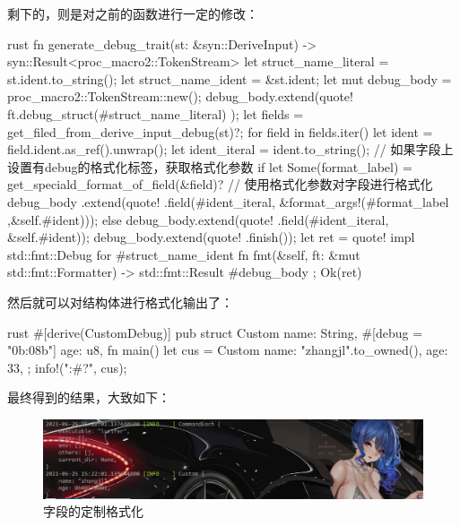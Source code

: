 剩下的，则是对之前的函数进行一定的修改：
\begin{code-block}{rust}
fn generate_debug_trait(st: &syn::DeriveInput) -> syn::Result<proc_macro2::TokenStream> {
    let struct_name_literal = st.ident.to_string();
    let struct_name_ident = &st.ident;
    let mut debug_body = proc_macro2::TokenStream::new();
    debug_body.extend(quote! {
        ft.debug_struct(#struct_name_literal)
    });
    let fields = get_filed_from_derive_input_debug(st)?;
    for field in fields.iter() {
        let ident = field.ident.as_ref().unwrap();
        let ident_iteral = ident.to_string();
        // 如果字段上设置有debug的格式化标签，获取格式化参数
        if let Some(format_label) = get_speciald_format_of_field(&field)? {
            // 使用格式化参数对字段进行格式化
            debug_body
                .extend(quote! {.field(#ident_iteral, &format_args!(#format_label ,&self.#ident))});
        } else {
            debug_body.extend(quote! {.field(#ident_iteral, &self.#ident)});
        }
    }
    debug_body.extend(quote! {.finish()});
    let ret = quote! {
        impl std::fmt::Debug for #struct_name_ident {
            fn fmt(&self, ft: &mut std::fmt::Formatter) -> std::fmt::Result {
                #debug_body
            }
        }
    };
    Ok(ret)
}
\end{code-block}
然后就可以对结构体进行格式化输出了：
\begin{code-block}{rust}
#[derive(CustomDebug)]
pub struct Custom {
    name: String,
    #[debug = "0b{:08b}"]
    age: u8,
}
fn main() {
    let cus = Custom {
        name: "zhangjl".to_owned(),
        age: 33,
    };
    info!("{:#?}", cus);
}
\end{code-block}
最终得到的结果，大致如下：
\begin{figure}[H]
  \centering
  \includegraphics[width=\linewidth]{rust_field_format.png}
  \caption{字段的定制格式化}
  \label{fig:rust_field_format}
\end{figure}

